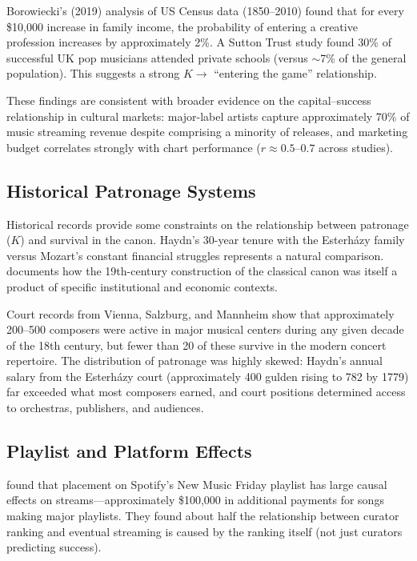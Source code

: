 \documentclass[11pt,a4paper]{article}
\begin{document}
Borowiecki's (2019) analysis of US Census data (1850--2010) found that for every \$10,000 increase in family income, the probability of entering a creative profession increases by approximately 2\%. A Sutton Trust study found 30\% of successful UK pop musicians attended private schools (versus $\sim$7\% of the general population). This suggests a strong $K \rightarrow$ ``entering the game'' relationship.

These findings are consistent with broader evidence on the capital--success relationship in cultural markets: major-label artists capture approximately 70\% of music streaming revenue despite comprising a minority of releases, and marketing budget correlates strongly with chart performance ($r \approx 0.5$--$0.7$ across studies).

\subsection{Historical Patronage Systems}

Historical records provide some constraints on the relationship between patronage ($K$) and survival in the canon. Haydn's 30-year tenure with the Esterh\'{a}zy family versus Mozart's constant financial struggles represents a natural comparison. \citet{weber1999} documents how the 19th-century construction of the classical canon was itself a product of specific institutional and economic contexts.

Court records from Vienna, Salzburg, and Mannheim show that approximately 200--500 composers were active in major musical centers during any given decade of the 18th century, but fewer than 20 of these survive in the modern concert repertoire. The distribution of patronage was highly skewed: Haydn's annual salary from the Esterh\'{a}zy court (approximately 400 gulden rising to 782 by 1779) far exceeded what most composers earned, and court positions determined access to orchestras, publishers, and audiences.

\subsection{Playlist and Platform Effects}

\citet{aguiar2021} found that placement on Spotify's New Music Friday playlist has large causal effects on streams---approximately \$100,000 in additional payments for songs making major playlists. They found about half the relationship between curator ranking and eventual streaming is caused by the ranking itself (not just curators predicting success).
\end{document}
